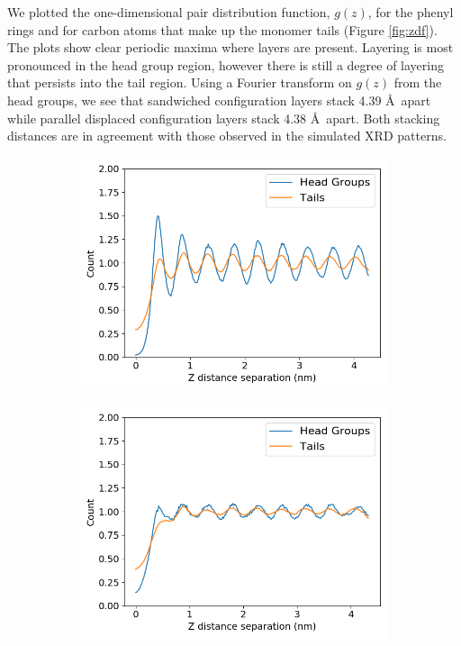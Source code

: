 \documentclass[journal=jpcbfk,manusciprt=article]{achemso}
\begin{document}
  We plotted the one-dimensional pair distribution function, $g(z)$, for the
  phenyl rings and for carbon atoms that make up the monomer tails (Figure
  \ref{fig:zdf}). The plots show clear periodic maxima where layers are present.
  Layering is most pronounced in the head group region, however there is still a
  degree of layering that persists into the tail region. Using a Fourier
  transform on $g(z)$ from the head groups, we see that sandwiched configuration
  layers stack 4.39 \AA~apart while parallel displaced configuration layers stack
  4.38 \AA~apart. Both stacking distances are in agreement with those observed
  in the simulated XRD patterns.

  \begin{figure}
        \centering
        \begin{subfigure}{0.45\textwidth}
                \centering
                \includegraphics[width=\textwidth]{zdf_overlay_layered.png}
                \caption{}\label{fig:zdf_layered}
        \end{subfigure}
        \begin{subfigure}{0.45\textwidth}
                \centering
                \includegraphics[width=\textwidth]{zdf_overlay_offset.png}

\end{subfigure}
\end{figure}
\end{document}

